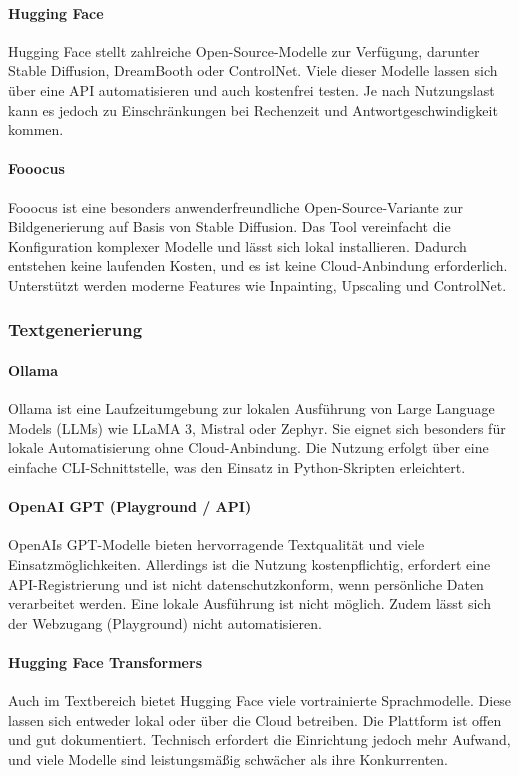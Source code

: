 \documentclass[a4paper,12pt]{article}
\begin{document}
\paragraph{Hugging Face}
Hugging Face stellt zahlreiche Open-Source-Modelle zur Verfügung, darunter Stable Diffusion, DreamBooth oder ControlNet. Viele dieser Modelle lassen sich über eine API automatisieren und auch kostenfrei testen. Je nach Nutzungslast kann es jedoch zu Einschränkungen bei Rechenzeit und Antwortgeschwindigkeit kommen.

\paragraph{Fooocus}
Fooocus ist eine besonders anwenderfreundliche Open-Source-Variante zur Bildgenerierung auf Basis von Stable Diffusion. Das Tool vereinfacht die Konfiguration komplexer Modelle und lässt sich lokal installieren. Dadurch entstehen keine laufenden Kosten, und es ist keine Cloud-Anbindung erforderlich. Unterstützt werden moderne Features wie Inpainting, Upscaling und ControlNet.

\subsubsection{Textgenerierung}

\paragraph{Ollama}
Ollama ist eine Laufzeitumgebung zur lokalen Ausführung von Large Language Models (LLMs) wie LLaMA 3, Mistral oder Zephyr. Sie eignet sich besonders für lokale Automatisierung ohne Cloud-Anbindung. Die Nutzung erfolgt über eine einfache CLI-Schnittstelle, was den Einsatz in Python-Skripten erleichtert.

\paragraph{OpenAI GPT (Playground / API)}
OpenAIs GPT-Modelle bieten hervorragende Textqualität und viele Einsatzmöglichkeiten. Allerdings ist die Nutzung kostenpflichtig, erfordert eine API-Registrierung und ist nicht datenschutzkonform, wenn persönliche Daten verarbeitet werden. Eine lokale Ausführung ist nicht möglich. Zudem lässt sich der Webzugang (Playground) nicht automatisieren.

\paragraph{Hugging Face Transformers}
Auch im Textbereich bietet Hugging Face viele vortrainierte Sprachmodelle. Diese lassen sich entweder lokal oder über die Cloud betreiben. Die Plattform ist offen und gut dokumentiert. Technisch erfordert die Einrichtung jedoch mehr Aufwand, und viele Modelle sind leistungsmäßig schwächer als ihre Konkurrenten.
\end{document}
